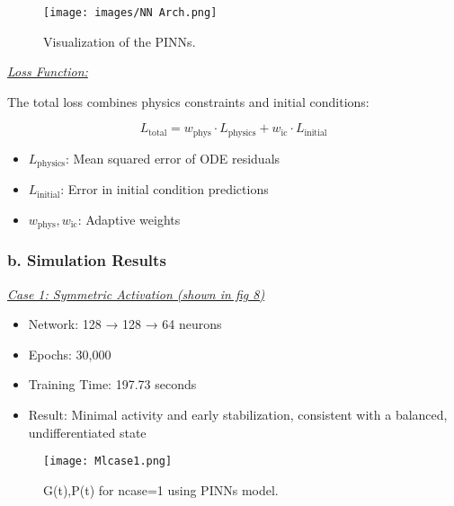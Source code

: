 \documentclass[journal]{IEEEtran}
\begin{document}
\begin{figure}[H]%
\begin {center}
\texttt{[image: images/NN Arch.png]}
\caption{ Visualization of the PINNs. }
\label{fig:ecg}
\end {center}
\end{figure}

\vspace{0.3em}

\underline{\textit{Loss Function:}}

The total loss combines physics constraints and initial conditions:

\[
L_{\text{total}} = w_{\text{phys}} \cdot L_{\text{physics}} + w_{\text{ic}} \cdot L_{\text{initial}}
\]

\begin{itemize}
    \item \( L_{\text{physics}} \): Mean squared error of ODE residuals
    \item \( L_{\text{initial}} \): Error in initial condition predictions
    \item \( w_{\text{phys}}, w_{\text{ic}} \): Adaptive weights
\end{itemize}

\vspace{1em}

\subsubsection*{\textbf{b. Simulation Results}} \hfill

\underline{\textit{Case 1: Symmetric Activation (shown in fig 8)}}
\begin{itemize}
    \item Network: 128 → 128 → 64 neurons
    \item Epochs: 30,000
    \item Training Time: 197.73 seconds
    \item Result: Minimal activity and early stabilization, consistent with a balanced, undifferentiated state
\end{itemize}

\begin{figure}[H]%
\begin {center}
\texttt{[image: Mlcase1.png]}
\caption{  G(t),P(t) for  ncase=1 using PINNs model. }
\label{fig:ecg}
\end {center}
\end{figure}
\vspace{0.5em}
\end{document}
